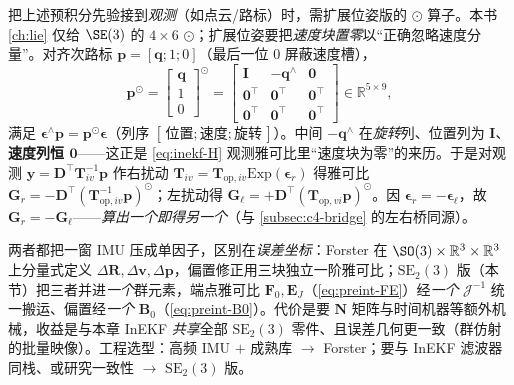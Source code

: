 把上述预积分先验接到\emph{观测}（如点云/路标）时，需扩展位姿版的 $\odot$ 算子。本书 \cref{ch:lie} 仅给 $\SE(3)$ 的 $4\times6$ $\odot$；扩展位姿要把\emph{速度块置零}以“正确忽略速度分量”\cite{barfoot2024state}。对齐次路标 $\mathbf{p}=[\mathbf{q};1;0]$（最后一位 $0$ 屏蔽速度槽），
\begin{equation}
  \mathbf{p}^\odot=\begin{bmatrix}\mathbf{q}\\1\\0\end{bmatrix}^{\!\odot}=\begin{bmatrix}\mathbf{I}&-\mathbf{q}^\wedge&\mathbf{0}\\\mathbf{0}^\top&\mathbf{0}^\top&\mathbf{0}^\top\\\mathbf{0}^\top&\mathbf{0}^\top&\mathbf{0}^\top\end{bmatrix}\in\mathbb{R}^{5\times9},
  \label{eq:se23-odot}
\end{equation}
满足 $\boldsymbol{\epsilon}^\wedge\mathbf{p}=\mathbf{p}^\odot\boldsymbol{\epsilon}$（列序 $[\,\text{位置};\text{速度};\text{旋转}\,]$）。中间 $-\mathbf{q}^\wedge$ 在\emph{旋转}列、位置列为 $\mathbf{I}$、\textbf{速度列恒 $\mathbf{0}$}——这正是 \cref{eq:inekf-H} 观测雅可比里“速度块为零”的来历。于是对观测 $\mathbf{y}=\mathbf{D}^\top\mathbf{T}_{iv}^{-1}\mathbf{p}$ 作右扰动 $\mathbf{T}_{iv}=\mathbf{T}_{\mathrm{op},iv}\mathrm{Exp}(\boldsymbol{\epsilon}_r)$ 得雅可比 $\mathbf{G}_r=-\mathbf{D}^\top(\mathbf{T}_{\mathrm{op},iv}^{-1}\mathbf{p})^\odot$；左扰动得 $\mathbf{G}_\ell=+\mathbf{D}^\top(\mathbf{T}_{\mathrm{op},vi}\mathbf{p})^\odot$。因 $\boldsymbol{\epsilon}_r=-\boldsymbol{\epsilon}_\ell$，故 $\mathbf{G}_r=-\mathbf{G}_\ell$——\emph{算出一个即得另一个}（与 \cref{subsec:c4-bridge} 的左右桥同源）。

\begin{insight}
两者都把一窗 IMU 压成单因子，区别在\emph{误差坐标}：Forster\cite{forster2017preintegration} 在 $\SO(3)\times\mathbb{R}^3\times\mathbb{R}^3$ 上分量式定义 $\Delta\mathbf{R},\Delta\mathbf{v},\Delta\mathbf{p}$，偏置修正用三块独立一阶雅可比；$\mathrm{SE}_2(3)$ 版（本节）把三者并进\emph{一个}群元素，端点雅可比 $\mathbf{F}_0,\mathbf{E}_J$（\cref{eq:preint-FE}）经\emph{一个} $\boldsymbol{\mathcal{J}}^{-1}$ 统一搬运、偏置经\emph{一个} $\mathbf{B}_0$（\cref{eq:preint-B0}）。代价是要 $\mathbf{N}$ 矩阵与时间机器等额外机械，收益是与本章 InEKF \emph{共享}全部 $\mathrm{SE}_2(3)$ 零件、且误差几何更一致（群仿射的批量映像）。工程选型：高频 IMU $+$ 成熟库 $\to$ Forster；要与 InEKF 滤波器同栈、或研究一致性 $\to$ $\mathrm{SE}_2(3)$ 版。
\end{insight}


